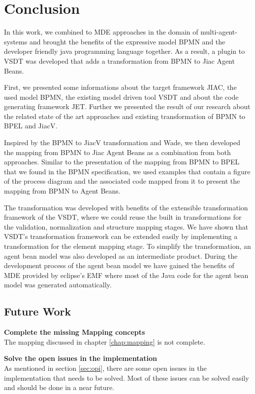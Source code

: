 \chapter{Conclusion}
\label{chap:conclusion}
In this work, we combined to MDE approaches in the domain of multi-agent-systems and brought the benefits of the expressive model BPMN and the developer friendly java programming language together. As a result, a plugin to VSDT was developed that adds a transformation from BPMN to Jiac Agent Beans. 

First, we presented some informations about the target framework JIAC, the used model BPMN, the existing model driven tool VSDT and about the code generating framework JET.  Further we presented the result of our research about the related state of the art approaches and existing transformation of BPMN to BPEL and JiacV. 

Inspired by the BPMN to JiacV transformation and Wade, we then developed the mapping from BPMN to Jiac Agent Beans as a combination from both approaches. Similar to the presentation of the mapping from BPMN to BPEL that we found in the BPMN specification, we used examples that contain a figure of the process diagram and the associated code mapped from it to present the mapping from BPMN to Agent Beans. 

The transformation was developed with benefits of the extensible transformation framework of the VSDT, where we could reuse the built in transformations for the validation, normalization and structure mapping stages. We have shown that VSDT's transformation framework can be extended easily by implementing a transformation for the element mapping stage. To simplify the transformation, an agent bean model was also developed as an intermediate product. During the development process of the agent bean model we have gained the benefits of MDE provided by eclipse's EMF where most of the Java code for the agent bean model was generated automatically.
\section{Future Work}

\textbf{Complete the missing Mapping concepts}\\
The mapping discussed in chapter \ref{chap:mapping} is not complete. 

\textbf{Solve the open issues in the implementation}\\
As mentioned in section \ref{sec:opi}, there are some open issues in the implementation that needs to be solved. Most of these issues can be solved easily and should be done in a near future. 

